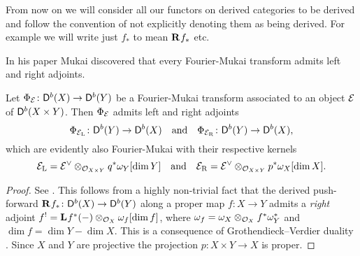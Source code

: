 \begin{remark}
    From now on we will consider all our functors on derived categories to be derived and follow the convention of not explicitly denoting them as being derived. For example we will write just $f_*$ to mean $\mathbf{R}^{}f_*$ etc.
\end{remark}

In his paper \cite{Mukai1981} Mukai discovered that every Fourier-Mukai transform admits left and right adjoints. 

\begin{proposition}[Mukai]
    \label{Adjoints of FM transforms}
    Let $\Phi_{\mathcal E} \colon \mathsf{D}^b(X) \to \mathsf{D}^b(Y)$ be a Fourier-Mukai transform associated to an object $\mathcal E$ of $\mathsf{D}^b(X \times Y)$. Then $\Phi_{\mathcal E}$ admits left and right adjoints
    \[
        \Phi_{\mathcal E_\mathrm{L}} \colon \mathsf{D}^b(Y) \to \mathsf{D}^b(X) \quad \text{and} \quad \Phi_{\mathcal E_\mathrm{R}} \colon \mathsf{D}^b(Y) \to \mathsf{D}^b(X),
    \]
    which are evidently also Fourier-Mukai with their respective kernels
    \[
        \mathcal E_\mathrm{L} = \mathcal E^\vee \otimes_{{\mathcal{O}_{X \times Y}}} q^*\omega_Y[\dim Y] \quad \text{and} \quad 
        \mathcal E_\mathrm{R} = \mathcal E^\vee \otimes_{{\mathcal{O}_{X \times Y}}} p^*\omega_X[\dim X].
    \]
\end{proposition}

\begin{proof}
    See \cite[\S 5, Proposition 5.9]{huybrechts2006fouriermukai}. This follows from a highly non-trivial fact that the derived push-forward $\mathbf{R}^{}f_* \colon \mathsf{D}^b(X) \to \mathsf{D}^b(Y)$ along a proper map $f \colon X \to Y$ admits a \emph{right} adjoint $f^! = \mathbf{L}^{}f^*(-) \otimes_{\mathcal{O}_{X}} \omega_f[\dim f]$, where $\omega_f = \omega_X \otimes_{\mathcal{O}_{X}} f^*\omega_Y^*$ and $\dim f = \dim Y - \dim X$. This is a consequence of Grothendieck--Verdier duality \cite[\S VII, Corollary 4.3]{Hartshorne1966}. Since $X$ and $Y$ are projective the projection $p \colon X \times Y \to X$ is proper.
\end{proof}

